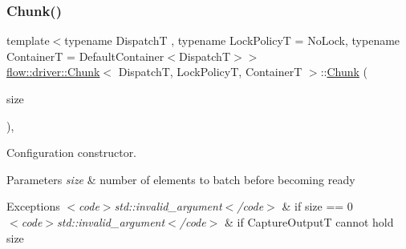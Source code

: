 \subsubsection{\texorpdfstring{Chunk()}{Chunk()}\hspace{0.1cm}{\footnotesize\ttfamily [1/2]}}
{\footnotesize\ttfamily template$<$typename DispatchT , typename Lock\+PolicyT  = No\+Lock, typename ContainerT  = Default\+Container$<$\+Dispatch\+T$>$$>$ \\
\hyperlink{classflow_1_1driver_1_1_chunk}{flow\+::driver\+::\+Chunk}$<$ DispatchT, Lock\+PolicyT, ContainerT $>$\+::\hyperlink{classflow_1_1driver_1_1_chunk}{Chunk} (\begin{DoxyParamCaption}\item[{const \hyperlink{classflow_1_1driver_1_1_chunk_aeab694f517dab9ae86da3369d5da57b6}{size\+\_\+type}}]{size }\end{DoxyParamCaption})\hspace{0.3cm}{\ttfamily [explicit]}, {\ttfamily [noexcept]}}



Configuration constructor. 


\begin{DoxyParams}{Parameters}
{\em size} & number of elements to batch before becoming ready\\
\hline
\end{DoxyParams}

\begin{DoxyExceptions}{Exceptions}
{\em $<$code$>$std\+::invalid\+\_\+argument$<$/code$>$} & if {\ttfamily size == 0} \\
\hline
{\em $<$code$>$std\+::invalid\+\_\+argument$<$/code$>$} & if {\ttfamily Capture\+OutputT} cannot hold {\ttfamily size} \\
\hline
\end{DoxyExceptions}
\mbox{\label{classflow_1_1driver_1_1_chunk_a801ccf653770947f13fd2124bf1aef41}} 
